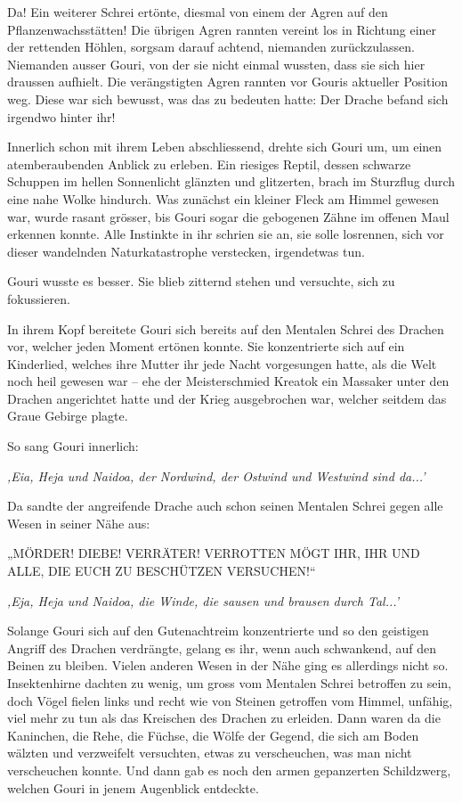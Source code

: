 Da! Ein weiterer Schrei ertönte, diesmal von einem der Agren auf den Pflanzenwachsstätten! Die übrigen Agren rannten vereint los in Richtung einer der rettenden Höhlen, sorgsam darauf achtend, niemanden zurückzulassen. Niemanden ausser Gouri, von der sie nicht einmal wussten, dass sie sich hier draussen aufhielt. Die verängstigten Agren rannten vor Gouris aktueller Position weg. Diese war sich bewusst, was das zu bedeuten hatte: Der Drache befand sich irgendwo hinter ihr!

Innerlich schon mit ihrem Leben abschliessend, drehte sich Gouri um, um einen atemberaubenden Anblick zu erleben. Ein riesiges Reptil, dessen schwarze Schuppen im hellen Sonnenlicht glänzten und glitzerten, brach im Sturzflug durch eine nahe Wolke hindurch. Was zunächst ein kleiner Fleck am Himmel gewesen war, wurde rasant grösser, bis Gouri sogar die gebogenen Zähne im offenen Maul erkennen konnte. Alle Instinkte in ihr schrien sie an, sie solle losrennen, sich vor dieser wandelnden Naturkatastrophe verstecken, irgendetwas tun.

Gouri wusste es besser. Sie blieb zitternd stehen und versuchte, sich zu fokussieren.

In ihrem Kopf bereitete Gouri sich bereits auf den Mentalen Schrei des Drachen vor, welcher jeden Moment ertönen konnte. Sie konzentrierte sich auf ein Kinderlied, welches ihre Mutter ihr jede Nacht vorgesungen hatte, als die Welt noch heil gewesen war – ehe der Meisterschmied Kreatok ein Massaker unter den Drachen angerichtet hatte und der Krieg ausgebrochen war, welcher seitdem das Graue Gebirge plagte.

So sang Gouri innerlich:

\textit{‚Eia, Heja und Naidoa, der Nordwind, der Ostwind und Westwind sind da...’}

Da sandte der angreifende Drache auch schon seinen Mentalen Schrei gegen alle Wesen in seiner Nähe aus:

„MÖRDER! DIEBE! VERRÄTER! VERROTTEN MÖGT IHR, IHR UND ALLE, DIE EUCH ZU BESCHÜTZEN VERSUCHEN!“

\textit{‚Eja, Heja und Naidoa, die Winde, die sausen und brausen durch Tal...’}

Solange Gouri sich auf den Gutenachtreim konzentrierte und so den geistigen Angriff des Drachen verdrängte, gelang es ihr, wenn auch schwankend, auf den Beinen zu bleiben. Vielen anderen Wesen in der Nähe ging es allerdings nicht so. Insektenhirne dachten zu wenig, um gross vom Mentalen Schrei betroffen zu sein, doch Vögel fielen links und recht wie von Steinen getroffen vom Himmel, unfähig, viel mehr zu tun als das Kreischen des Drachen zu erleiden. Dann waren da die Kaninchen, die Rehe, die Füchse, die Wölfe der Gegend, die sich am Boden wälzten und verzweifelt versuchten, etwas zu verscheuchen, was man nicht verscheuchen konnte. Und dann gab es noch den armen gepanzerten Schildzwerg, welchen Gouri in jenem Augenblick entdeckte.


